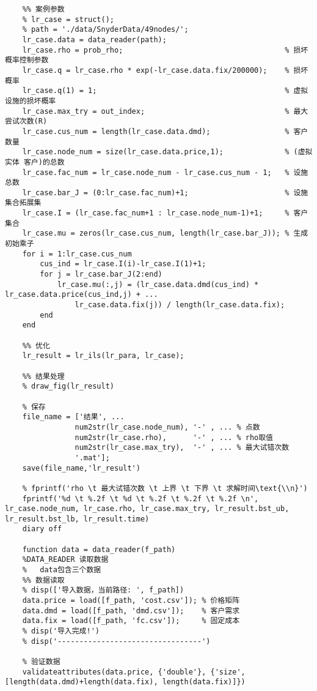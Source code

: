 {\begin{lstlisting}
    %% 案例参数
    % lr_case = struct();
    % path = './data/SnyderData/49nodes/';
    lr_case.data = data_reader(path);
    lr_case.rho = prob_rho;                                     % 损坏概率控制参数
    lr_case.q = lr_case.rho * exp(-lr_case.data.fix/200000);    % 损坏概率
    lr_case.q(1) = 1;                                           % 虚拟设施的损坏概率
    lr_case.max_try = out_index;                                % 最大尝试次数(R)
    lr_case.cus_num = length(lr_case.data.dmd);                 % 客户数量
    lr_case.node_num = size(lr_case.data.price,1);              % (虚拟 实体 客户)的总数
    lr_case.fac_num = lr_case.node_num - lr_case.cus_num - 1;   % 设施总数
    lr_case.bar_J = (0:lr_case.fac_num)+1;                      % 设施集合拓展集
    lr_case.I = (lr_case.fac_num+1 : lr_case.node_num-1)+1;     % 客户集合
    lr_case.mu = zeros(lr_case.cus_num, length(lr_case.bar_J)); % 生成初始乘子
    for i = 1:lr_case.cus_num
        cus_ind = lr_case.I(i)-lr_case.I(1)+1;
        for j = lr_case.bar_J(2:end)
            lr_case.mu(:,j) = (lr_case.data.dmd(cus_ind) * lr_case.data.price(cus_ind,j) + ...
                lr_case.data.fix(j)) / length(lr_case.data.fix);
        end
    end

    %% 优化
    lr_result = lr_ils(lr_para, lr_case);

    %% 结果处理
    % draw_fig(lr_result)

    % 保存
    file_name = ['结果', ...
                num2str(lr_case.node_num), '-' , ... % 点数
                num2str(lr_case.rho),      '-' , ... % rho取值
                num2str(lr_case.max_try),  '-' , ... % 最大试错次数
                '.mat'];
    save(file_name,'lr_result')

    % fprintf('rho \t 最大试错次数 \t 上界 \t 下界 \t 求解时间\text{\\n}')
    fprintf('%d \t %.2f \t %d \t %.2f \t %.2f \t %.2f \n', lr_case.node_num, lr_case.rho, lr_case.max_try, lr_result.bst_ub, lr_result.bst_lb, lr_result.time)
    diary off

    function data = data_reader(f_path)
    %DATA_READER 读取数据
    %   data包含三个数据
    %% 数据读取
    % disp(['导入数据，当前路径: ', f_path])
    data.price = load([f_path, 'cost.csv']); % 价格矩阵
    data.dmd = load([f_path, 'dmd.csv']);    % 客户需求
    data.fix = load([f_path, 'fc.csv']);     % 固定成本
    % disp('导入完成!')
    % disp('---------------------------------')

    % 验证数据
    validateattributes(data.price, {'double'}, {'size', [length(data.dmd)+length(data.fix), length(data.fix)]})


\end{lstlisting}}

